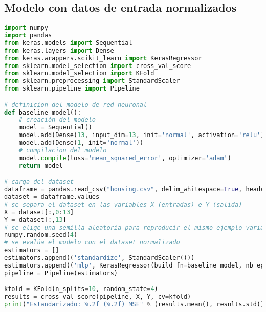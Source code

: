 \subsection{Modelo con datos de entrada normalizados}
\begin{lstlisting}[language=Python]
import numpy
import pandas
from keras.models import Sequential
from keras.layers import Dense
from keras.wrappers.scikit_learn import KerasRegressor
from sklearn.model_selection import cross_val_score
from sklearn.model_selection import KFold
from sklearn.preprocessing import StandardScaler
from sklearn.pipeline import Pipeline

# definicion del modelo de red neuronal
def baseline_model():
	# creación del modelo
	model = Sequential()
	model.add(Dense(13, input_dim=13, init='normal', activation='relu'))
	model.add(Dense(1, init='normal'))
	# compilacion del modelo
	model.compile(loss='mean_squared_error', optimizer='adam')
	return model

# carga del dataset
dataframe = pandas.read_csv("housing.csv", delim_whitespace=True, header=None)
dataset = dataframe.values
# se separa el dataset en las variables X (entradas) e Y (salida)
X = dataset[:,0:13]
Y = dataset[:,13]
# se elige una semilla aleatoria para reproducir el mismo ejemplo varias veces
numpy.random.seed(4)
# se evalúa el modelo con el dataset normalizado
estimators = []
estimators.append(('standardize', StandardScaler()))
estimators.append(('mlp', KerasRegressor(build_fn=baseline_model, nb_epoch=50, batch_size=5, verbose=0)))
pipeline = Pipeline(estimators)

kfold = KFold(n_splits=10, random_state=4)
results = cross_val_score(pipeline, X, Y, cv=kfold)
print("Estandarizado: %.2f (%.2f) MSE" % (results.mean(), results.std()))
\end{lstlisting}

